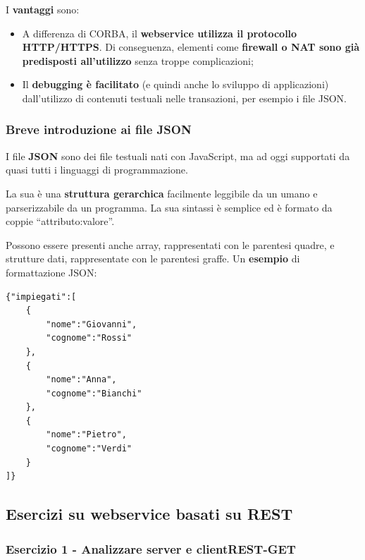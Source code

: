 \documentclass[a4paper]{article}
\newcommand{\dquotes}[1]{``#1''}
\begin{document}
	\noindent
	I \textcolor{Green4}{\textbf{vantaggi}} sono:
	\begin{itemize}
		\item A differenza di CORBA, il \textbf{webservice utilizza il protocollo HTTP/HTTPS}. Di conseguenza, elementi come \textbf{firewall o NAT sono già predisposti all'utilizzo} senza troppe complicazioni;
		
		\item Il \textbf{debugging è facilitato} (e quindi anche lo sviluppo di applicazioni) dall'utilizzo di contenuti testuali nelle transazioni, per esempio i file JSON.
	\end{itemize}\newpage
	
	\subsubsection{Breve introduzione ai file JSON}
	
	I file \textcolor{Red3}{\textbf{JSON}} sono dei file testuali nati con JavaScript, ma ad oggi supportati da quasi tutti i linguaggi di programmazione.\newline
	
	\noindent
	La sua è una \textbf{struttura gerarchica} facilmente leggibile da un umano e parserizzabile da un programma. La sua sintassi è semplice ed è formato da coppie \dquotes{\textsf{attributo:valore}}.\newline
	
	\noindent
	Possono essere presenti anche array, rappresentati con le parentesi quadre, e strutture dati, rappresentate con le parentesi graffe. Un \textcolor{Green4}{\textbf{esempio}} di formattazione JSON:
	\begin{lstlisting}
{"impiegati":[
	{
		"nome":"Giovanni",
		"cognome":"Rossi"
	},
	{
		"nome":"Anna",
		"cognome":"Bianchi"
	},
	{
		"nome":"Pietro",
		"cognome":"Verdi"
	}
]}\end{lstlisting}\newpage

	\subsection[\textcolor{Red3}{\textbf{Esercizi}} su webservice basati su REST]{Esercizi su webservice basati su REST}
	
	\subsubsection{Esercizio 1 - Analizzare server e \textsf{clientREST-GET}}
	
\end{document}

